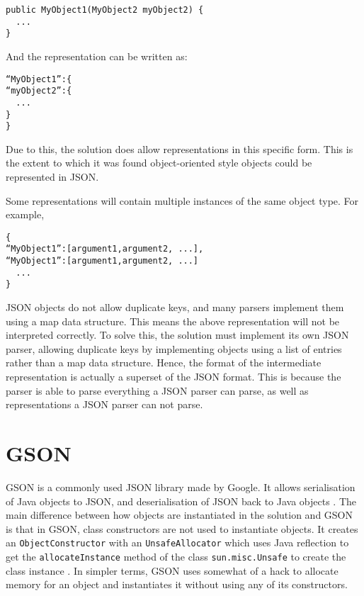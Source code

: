 \begin{verbatim}
public MyObject1(MyObject2 myObject2) {
  ...
}
\end{verbatim}
And the representation can be written as:
\begin{verbatim}
“MyObject1”:{
“myObject2”:{
  ...
}
}
\end{verbatim}
Due to this, the solution does allow representations in this specific form. This is the extent to which it was found object-oriented style objects could be represented in JSON.\par
Some representations will contain multiple instances of the same object type. For example,
\begin{verbatim}
{
“MyObject1”:[argument1,argument2, ...],
“MyObject1”:[argument1,argument2, ...]
  ...
}
\end{verbatim}
JSON objects do not allow duplicate keys, and many parsers implement them using a map data structure. This means the above representation will not be interpreted correctly. To solve this, the solution must implement its own JSON parser, allowing duplicate keys by implementing objects using a list of entries rather than a map data structure. Hence, the format of the intermediate representation is actually a superset of the JSON format. This is because the parser is able to parse everything a JSON parser can parse, as well as representations a JSON parser can not parse.

\section{GSON}

GSON is a commonly used JSON library made by Google. It allows serialisation of Java objects to JSON, and deserialisation of JSON back to Java objects \cite{gson}. The main difference between how objects are instantiated in the solution and GSON is that in GSON, class constructors are not used to instantiate objects. It creates an \texttt{ObjectConstructor} with an \texttt{UnsafeAllocator} which uses Java reflection to get the \texttt{allocateInstance} method of the class \texttt{sun.misc.Unsafe} to create the class instance \cite{gson_instance_creator}. In simpler terms, GSON uses somewhat of a hack to allocate memory for an object and instantiates it without using any of its constructors.\par
